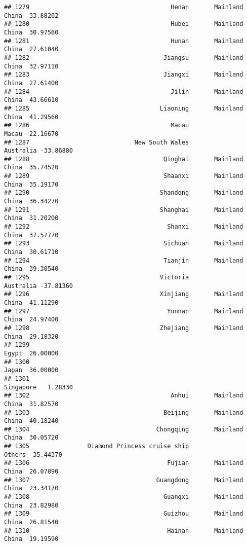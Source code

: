 \documentclass[
]{article}
\begin{document}
\begin{verbatim}
## 1279                                       Henan       Mainland China  33.88202
## 1280                                       Hubei       Mainland China  30.97560
## 1281                                       Hunan       Mainland China  27.61040
## 1282                                     Jiangsu       Mainland China  32.97110
## 1283                                     Jiangxi       Mainland China  27.61400
## 1284                                       Jilin       Mainland China  43.66610
## 1285                                    Liaoning       Mainland China  41.29560
## 1286                                       Macau                Macau  22.16670
## 1287                             New South Wales            Australia -33.86880
## 1288                                     Qinghai       Mainland China  35.74520
## 1289                                     Shaanxi       Mainland China  35.19170
## 1290                                    Shandong       Mainland China  36.34270
## 1291                                    Shanghai       Mainland China  31.20200
## 1292                                      Shanxi       Mainland China  37.57770
## 1293                                     Sichuan       Mainland China  30.61710
## 1294                                     Tianjin       Mainland China  39.30540
## 1295                                    Victoria            Australia -37.81360
## 1296                                    Xinjiang       Mainland China  41.11290
## 1297                                      Yunnan       Mainland China  24.97400
## 1298                                    Zhejiang       Mainland China  29.18320
## 1299                                                            Egypt  26.00000
## 1300                                                            Japan  36.00000
## 1301                                                        Singapore   1.28330
## 1302                                       Anhui       Mainland China  31.82570
## 1303                                     Beijing       Mainland China  40.18240
## 1304                                   Chongqing       Mainland China  30.05720
## 1305                Diamond Princess cruise ship               Others  35.44370
## 1306                                      Fujian       Mainland China  26.07890
## 1307                                   Guangdong       Mainland China  23.34170
## 1308                                     Guangxi       Mainland China  23.82980
## 1309                                     Guizhou       Mainland China  26.81540
## 1310                                      Hainan       Mainland China  19.19590

\end{verbatim}
\end{document}
